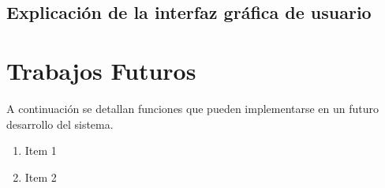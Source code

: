 \documentclass[11pt]{article}
\begin{document}
\subsection{Explicación de la interfaz gráfica de usuario}

\section{Trabajos Futuros}
A continuación se detallan funciones que pueden implementarse en un futuro desarrollo del sistema.
\begin{enumerate}
    \item Item 1
    \item Item 2
\end{enumerate}
\end{document}
